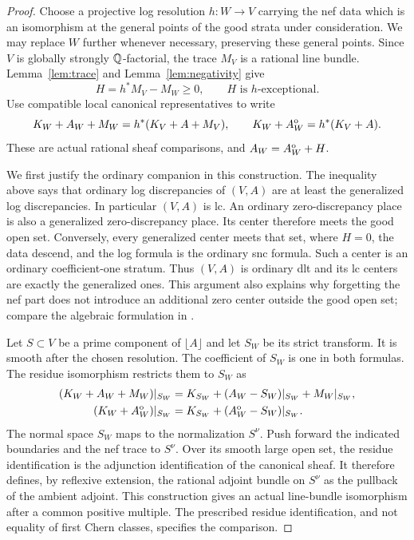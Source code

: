 \begin{proof}
Choose a projective log resolution $h:W\to V$ carrying the nef
data which is an isomorphism at the general points of the good
strata under consideration.  We may replace $W$ further whenever
necessary, preserving these general points.  Since $V$ is globally
strongly $\mathbb Q$-factorial, the trace $M_V$ is a rational line bundle.
Lemma~\ref{lem:trace} and Lemma~\ref{lem:negativity} give
\begin{equation}\label{eq:adjunction-nef-defect}
 H=h^*M_V-M_W\geq0,
 \qquad H\text{ is }h\text{-exceptional}.
\end{equation}
Use compatible local canonical representatives to write
\[
 K_W+A_W+M_W=h^*(K_V+A+M_V),\qquad
 K_W+A_W^{\rm o}=h^*(K_V+A).
\]
These are actual rational sheaf comparisons, and
$A_W=A_W^{\rm o}+H$.

We first justify the ordinary companion in this construction.
The inequality above says that ordinary log discrepancies of
$(V,A)$ are at least the generalized log discrepancies.  In
particular $(V,A)$ is lc.  An ordinary zero-discrepancy place is
also a generalized zero-discrepancy place.  Its center therefore
meets the good open set.  Conversely, every generalized center
meets that set, where $H=0$, the data descend, and the log formula
is the ordinary snc formula.  Such a center is an ordinary
coefficient-one stratum.  Thus $(V,A)$ is ordinary dlt and its lc
centers are exactly the generalized ones.  This argument also
explains why forgetting the nef part does not introduce an
additional zero center outside the good open set; compare the
algebraic formulation in \cite[Remark~2.6(1)]{CT2023}.

Let $S\subset V$ be a prime component of $\lfloor A\rfloor$ and
let $S_W$ be its strict transform.  It is smooth after the chosen
resolution.  The coefficient of $S_W$ is one in both formulas.
The residue isomorphism restricts them to $S_W$ as
\begin{align*}
 (K_W+A_W+M_W)|_{S_W}
  &=K_{S_W}+(A_W-S_W)|_{S_W}+M_W|_{S_W},\\
 (K_W+A_W^{\rm o})|_{S_W}
  &=K_{S_W}+(A_W^{\rm o}-S_W)|_{S_W}.
\end{align*}
The normal space $S_W$ maps to the normalization $S^\nu$.
Push forward the indicated boundaries and the nef trace to
$S^\nu$.  Over its smooth large open set, the residue
identification is the adjunction identification of the canonical
sheaf.  It therefore defines, by reflexive extension, the
rational adjoint bundle on $S^\nu$ as the pullback of the
ambient adjoint.  This construction gives an actual line-bundle
isomorphism after a common positive multiple.  The prescribed
residue identification, and not equality of first Chern classes,
specifies the comparison.


\end{proof}

